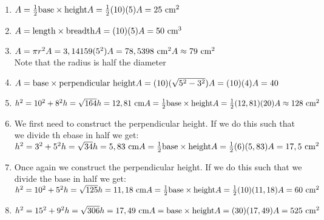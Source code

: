  \begin{solutions}{}{
\begin{enumerate}[itemsep=5pt, label=\textbf{\arabic*}. ] 
\item 
$A = \frac{1}{2} \text{base} \times \text{height}\\
A = \frac{1}{2}(10)(5)\\
A = 25 \text{ cm}^{2}$
\item
$A = \text{length} \times \text{breadth}\\
A = (10)(5)\\
A = 50 \text{ cm}^{3}$
\item
$A = \pi r^{2}\\
A = 3,14159(5^{2})\\
A = 78,5398 \text{ cm}^{2}\\
A \approx 79 \text{ cm}^{2}$\\
Note that the radius is half the diameter
\item
$A = \text{base} \times \text{perpendicular height}\\
A = (10)(\sqrt{5^{2} - 3^{2}}) \\
A = (10)(4) \\
A = 40$
\item
$h^{2} = 10^{2} + 8^{2} \\
h = \sqrt{164}\\
h = 12,81 \text{ cm}\\
A = \frac{1}{2} \text{base} \times \text{height}\\
A = \frac{1}{2} (12,81)(20)\\
A \approx 128 \text{ cm}^2$
\item
We first need to construct the perpendicular height. If we do this such that we divide th ebase in half we get:\\
$h^2 = 3^2 + 5^2 \\
h = \sqrt{34}\\
h = 5,83 \text{ cm}\\
A = \frac{1}{2}\text{base} \times \text{height}\\
A = \frac{1}{2}(6)(5,83)\\
A = 17,5 \text{ cm}^{2}$
\item Once again we construct the perpendicular height. If we do this such that we divide the base in half we get:\\
$h^2 = 10^2 + 5^2 \\
h = \sqrt{125}\\
h = 11,18 \text{ cm}\\
A = \frac{1}{2}\text{base} \times \text{height}\\
A = \frac{1}{2}(10)(11,18)\\
A = 60 \text{ cm}^{2}$
\item
$h^2 = 15^2 + 9^2 \\
h = \sqrt{306}\\
h = 17,49 \text{ cm}\\
A = \text{base} \times \text{height}\\
A = (30)(17,49)\\
A = 525 \text{ cm}^{2}$
\end{enumerate}}
\end{solutions}


